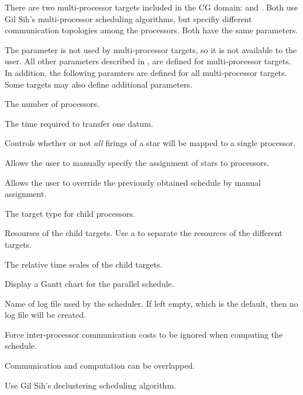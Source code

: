 There are two multi-processor targets included in the CG domain:
 and .
Both use Gil Sih's
multi-processor scheduling algorithms, but specifiy different
communication topologies among the processors.  Both have the same
parameters.

The  parameter is not used by multi-processor
targets, so it is not available to the user.  All other parameters
described in , are defined for
multi-processor targets.  In addition, the following paramters are
defined for all multi-processor targets.  Some targets may also define
additional parameters.

\begin{statelist}
The number of processors.


The time required to transfer one datum.

Controls whether or not \emph{all} firings of a star will be mapped to
a single processor.

Allows the user to manually specify the assignment of stars to processors.

Allows the user to override the previously obtained schedule by manual
assignment.

The target type for child processors.

Resourses of the child targets.  Use a \samp{;} to separate the resources of
the different targets.

The relative time scales of the child targets.

Display a Gantt chart for the parallel schedule.

Name of log file used by the scheduler.  If left empty, which is the default,
then no log file will be created.


Force inter-processor communication costs to be ignored when computing the
schedule.

Communication and computation can be overlapped.

Use Gil Sih's declustering scheduling algorithm.

\end{statelist}

